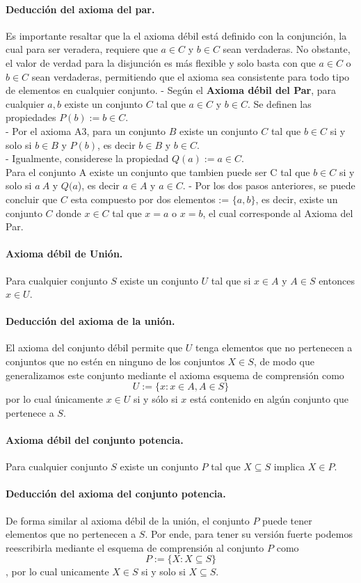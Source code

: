 \documentclass{article}
\begin{document}
	\paragraph{Deducción del axioma del par.}
	Es importante resaltar que la el axioma débil está definido con la conjunción, la cual para ser veradera, requiere que $a \in C$ y $b \in C$ sean verdaderas. No obstante, el valor de verdad para la disjunción es más flexible y solo basta con que $a \in C$ o $b \in C$ sean verdaderas, permitiendo que el axioma sea consistente para todo tipo de elementos en cualquier conjunto.
	- Según el \textbf{Axioma débil del Par}, para cualquier $a,b$ existe un conjunto $C$ tal que $a \in C$ y
	$b \in C$. Se definen las propiedades $P(b) := b \in C$.\\
	- Por el axioma A3, para un conjunto $B$ existe un conjunto $C$ tal que $b \in C$ si y solo si $b \in B$ y $P(b)$,
	es decir $b \in B$ y $b \in C$.\\
	- Igualmente, considerese la propiedad $Q(a) := a \in C$.\\
	Para el conjunto A existe un conjunto que
	tambien puede ser C tal que $b \in C$ si y solo si $a \ A$ y $Q(a$), es decir $a \in A$ y $a \in C$.
	- Por los dos pasos anteriores, se puede concluir que $C$ esta compuesto por dos elementos := $\{a, b\}$, es
	decir, existe un conjunto $C$ donde $x \in C$ tal que $x = a$ o $x = b$, el cual corresponde al Axioma del Par.
	\paragraph{Axioma débil de Unión.} Para cualquier conjunto $S$ existe un conjunto $U$ tal que si $x \in A$ y $A \in S$ entonces $x \in U$.
	\paragraph{Deducción del axioma de la unión.} El axioma del conjunto débil permite que $U$ tenga elementos que no pertenecen a conjuntos que no estén en ninguno de los conjuntos $X \in S$, de modo que generalizamos este conjunto mediante el axioma esquema de comprensión como 
	$$U:=\{x:x \in A , A \in S\}$$
	por lo cual únicamente $x \in U$ si y sólo si $x$ está contenido en algún conjunto que pertenece a $S$.
	\paragraph{Axioma débil del conjunto potencia.} Para cualquier conjunto $S$ existe un conjunto $P$ tal que $X \subseteq S$ implica $X \in P$.
	\paragraph{Deducción del axioma del conjunto potencia.} De forma similar al axioma débil de la unión, el conjunto $P$ puede tener elementos que no pertenecen a $S$. Por ende, para tener su versión fuerte podemos reescribirla mediante el esquema de comprensión al conjunto $P$ como
	$$P:=\{ X: X \subseteq S\}$$,
	por lo cual unicamente $X \in S$ si y solo si $X \subseteq S$.
\end{document}
